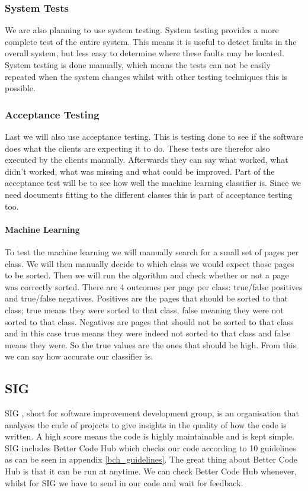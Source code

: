 \subsubsection{System Tests}
We are also planning to use system testing. System testing provides a more complete test of the entire system. This means it is useful to detect faults in the overall system, but less easy to determine where these faults may be located. System testing is done manually, which means the tests can not be easily repeated when the system changes whilst with other testing techniques this is possible.

\subsubsection{Acceptance Testing}
Last we will also use acceptance testing. This is testing done to see if the software does what the clients are expecting it to do. These tests are therefor also executed by the clients manually. Afterwards they can say what worked, what didn't worked, what was missing and what could be improved. Part of the acceptance test will be to see how well the machine learning classifier is. Since we need documents fitting to the different classes this is part of acceptance testing too.\\

\paragraph{Machine Learning}
To test the machine learning we will manually search for a small set of pages per class. We will then manually decide to which class we would expect those pages to be sorted. Then we will run the algorithm and check whether or not a page was correctly sorted. There are 4 outcomes per page per class: true/false positives and true/false negatives. Positives are the pages that should be sorted to that class; true means they were sorted to that class, false meaning they were not sorted to that class. Negatives are pages that should not be sorted to that class and in this case true means they were indeed not sorted to that class and false means they were. So the true values are the ones that should be high. From this we can say how accurate our classifier is. 

\subsection{SIG}
SIG \cite{sig}, short for software improvement development group, is an organisation that analyses the code of projects to give insights in the quality of how the code is written. A high score means the code is highly maintainable and is kept simple. SIG includes Better Code Hub \cite{better_code_hub} which checks our code according to 10 guidelines as can be seen in appendix \ref{bch_guidelines}. The great thing about Better Code Hub is that it can be run at anytime. We can check Better Code Hub whenever, whilst for SIG we have to send in our code and wait for feedback.